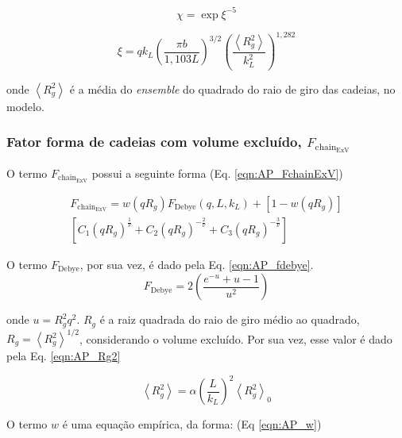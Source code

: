 \begin{apendicesenv}
\begin{equation}
\chi = \exp{\xi^{-5}}
\label{eqn:AP_chi}
\end{equation}

\begin{equation}
\xi = q k_L\left(\frac{\pi b}{1{,}103L}\right)^{3/2}\left(\frac{\left<R_g^2\right>}{k_L^2}\right)^{1{,}282}
\label{eqn:AP_xi}
\end{equation}

\noindent onde \(\left<R_g^2\right>\) é a média do \emph{ensemble} do quadrado do raio de giro das cadeias, no modelo.

\subsubsection{Fator forma de cadeias com volume excluído, \(F_{\mathrm{chain}_{\mathrm{ExV}}}\)}
\label{sec:F_chain_ExV_equacoes}
O termo \(F_{\mathrm{chain}_{\mathrm{ExV}}}\) possui a seguinte forma (Eq. \ref{eqn:AP_FchainExV})

\begin{multline}
F_{\mathrm{chain}_{\mathrm{ExV}}} = w(qR_g)F_{\mathrm{Debye}}(q,L,k_L) + \left[1 - w(q R_g)\right] \\ \left[C_1(q R_g)^{\frac{1}{\nu}} + C_2(q R_g)^{-\frac{2}{\nu}} + 
C_3(q R_g)^{-\frac{3}{\nu}}\right]
\label{eqn:AP_FchainExV}
\end{multline}

O termo \(F_{\mathrm{Debye}}\), por sua vez, é dado pela Eq. \ref{eqn:AP_fdebye}.
\begin{equation}
F_{\mathrm{Debye}} = 2 \left(\frac{e^{-u} + u - 1}{u^2}\right)
\label{eqn:AP_fdebye}
\end{equation}

\noindent onde \(u = R_g^2q^2\). \(R_g\) é a raiz quadrada do raio de giro médio ao quadrado, \(R_g = \left<R_g^2\right>^{1/2}\), considerando o volume excluído. Por sua vez, esse valor é dado pela Eq. \ref{eqn:AP_Rg2}

\begin{equation}
\left<R_g^2\right> = \alpha \left(\frac{L}{k_L}\right)^2\left<R_g^2\right>_0
\label{eqn:AP_Rg2}
\end{equation}

O termo \(w\) é uma equação empírica, da forma: (Eq \ref{eqn:AP_w})


\end{apendicesenv}
